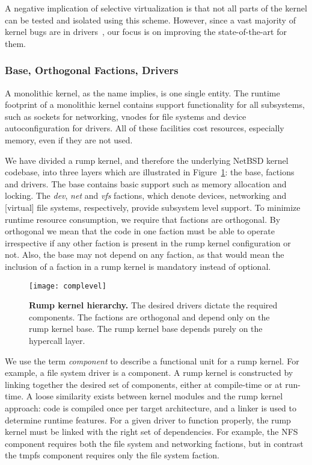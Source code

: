 A negative implication of selective virtualization is that not all
parts of the kernel can be tested and isolated using this scheme.
However, since a vast majority of kernel bugs are in
drivers~\cite{chou:oserr}, our focus is on improving the
state-of-the-art for them.

\subsubsection{Base, Orthogonal Factions, Drivers}

A monolithic kernel, as the name implies, is one single entity.  The
runtime footprint of a monolithic kernel contains support functionality
for all subsystems, such as sockets for networking, vnodes for file
systems and device autoconfiguration for drivers.  All of these
facilities cost resources, especially memory, even if they are not
used.

We have divided a rump kernel, and therefore the underlying NetBSD
kernel codebase, into three layers which are illustrated in
Figure~\ref{fig:rumpcode}: the base, factions and drivers.  The base
contains basic support such as memory allocation and locking.  The
\textit{dev}, \textit{net} and \textit{vfs} factions, which denote
devices, networking and [virtual] file systems, respectively,
provide subsystem level support.  To minimize runtime resource
consumption, we require that factions are orthogonal.  By orthogonal
we mean that the code in
one faction must be able to operate irrespective if any other
faction is present in the rump kernel configuration or not.  Also, the base may
not depend on any faction, as that would mean the inclusion of a
faction in a rump kernel is mandatory instead of optional.

\begin{figure}[t]
\texttt{[image: complevel]}
\caption[Rump kernel hierarchy]{\textbf{Rump kernel hierarchy.}
The desired drivers dictate the required components.  The factions
are orthogonal and depend only on the rump kernel base.  The rump
kernel base depends purely on the hypercall layer.}
\label{fig:rumpcode}
\end{figure}

We use the term \textit{component} to describe a functional unit for a
rump kernel.  For example, a file system driver is a component.  A rump
kernel is constructed by linking together the desired set of components,
either at compile-time or at run-time.  A loose similarity exists between
kernel modules and the rump kernel approach: code is compiled once per
target architecture, and a linker is used to determine runtime features.
For a given driver to function properly, the rump kernel must be linked
with the right set of dependencies.  For example, the NFS component requires
both the file system and networking factions, but in contrast the tmpfs
component requires only the file system faction.

